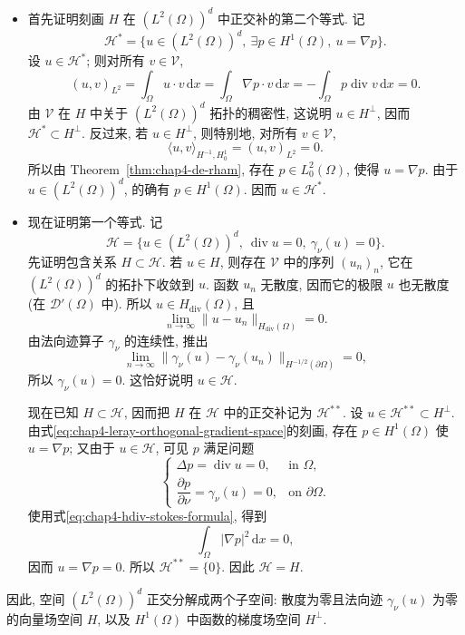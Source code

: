 \begin{Proof}
\begin{itemize}
 \item 首先证明刻画 $H$ 在 $(L^2(\Omega))^d$ 中正交补的第二个等式. 记
 \[
  \mathcal H^*=\{u\in(L^2(\Omega))^d,\ \exists p\in H^1(\Omega),\ u=\nabla p\}.
 \]
 设 $u\in\mathcal H^*$; 则对所有 $v\in\mathcal V$,
 \[
  (u,v)_{L^2}
  =\int_\Omega u\cdot v\,\mathrm dx
  =\int_\Omega\nabla p\cdot v\,\mathrm dx
  =-\int_\Omega p\operatorname{div}v\,\mathrm dx=0.
 \]
 由 $\mathcal V$ 在 $H$ 中关于 $(L^2(\Omega))^d$ 拓扑的稠密性, 这说明 $u\in H^\perp$, 因而 $\mathcal H^*\subset H^\perp$. 反过来, 若 $u\in H^\perp$, 则特别地, 对所有 $v\in\mathcal V$,
 \[
  \langle u,v\rangle_{H^{-1},H_0^1}=(u,v)_{L^2}=0.
 \]
 所以由 Theorem~\ref{thm:chap4-de-rham}, 存在 $p\in L_0^2(\Omega)$, 使得 $u=\nabla p$. 由于 $u\in(L^2(\Omega))^d$, 的确有 $p\in H^1(\Omega)$. 因而 $u\in\mathcal H^*$.

 \item 现在证明第一个等式. 记
 \[
  \mathcal H=\{u\in(L^2(\Omega))^d,\ \operatorname{div}u=0,\ \gamma_\nu(u)=0\}.
 \]
 先证明包含关系 $H\subset\mathcal H$. 若 $u\in H$, 则存在 $\mathcal V$ 中的序列 $(u_n)_n$, 它在 $(L^2(\Omega))^d$ 的拓扑下收敛到 $u$. 函数 $u_n$ 无散度, 因而它的极限 $u$ 也无散度 (在 $\mathcal D'(\Omega)$ 中). 所以 $u\in H_{\operatorname{div}}(\Omega)$, 且
 \[
  \lim_{n\to\infty}\|u-u_n\|_{H_{\operatorname{div}}(\Omega)}=0.
 \]
 由法向迹算子 $\gamma_\nu$ 的连续性, 推出
 \[
  \lim_{n\to\infty}
  \|\gamma_\nu(u)-\gamma_\nu(u_n)\|_{H^{-1/2}(\partial\Omega)}=0,
 \]
 所以 $\gamma_\nu(u)=0$. 这恰好说明 $u\in\mathcal H$.

 现在已知 $H\subset\mathcal H$, 因而把 $H$ 在 $\mathcal H$ 中的正交补记为 $\mathcal H^{**}$. 设 $u\in\mathcal H^{**}\subset H^\perp$. 由式\eqref{eq:chap4-leray-orthogonal-gradient-space}的刻画, 存在 $p\in H^1(\Omega)$ 使 $u=\nabla p$; 又由于 $u\in\mathcal H$, 可见 $p$ 满足问题
 \[
  \begin{cases}
   \Delta p=\operatorname{div}u=0,&\text{in }\Omega,\\
   \dfrac{\partial p}{\partial\nu}=\gamma_\nu(u)=0,&\text{on }\partial\Omega.
  \end{cases}
 \]
 使用式\eqref{eq:chap4-hdiv-stokes-formula}, 得到
 \[
  \int_\Omega|\nabla p|^2\,\mathrm dx=0,
 \]
 因而 $u=\nabla p=0$. 所以 $\mathcal H^{**}=\{0\}$. 因此 $\mathcal H=H$.
\end{itemize}
\end{Proof}

因此, 空间 $(L^2(\Omega))^d$ 正交分解成两个子空间: 散度为零且法向迹 $\gamma_\nu(u)$ 为零的向量场空间 $H$, 以及 $H^1(\Omega)$ 中函数的梯度场空间 $H^\perp$.

